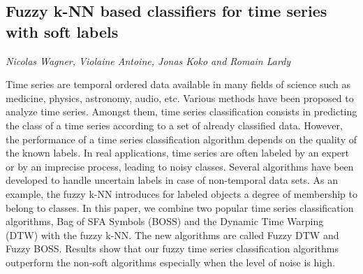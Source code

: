 \documentclass[../booklet.tex]{subfiles}
\begin{document}
\subsection[Fuzzy k-NN based classifiers for time series with soft labels. {\it Nicolas Wagner, Violaine Antoine, Jonas Koko and Romain Lardy}]{Fuzzy k-NN based classifiers for time series with soft labels}
   

\begin{center}
  {\it Nicolas Wagner, Violaine Antoine, Jonas Koko and Romain Lardy}
\end{center}

\vskip 0.8cm


Time series are temporal ordered data available in many fields of science such as medicine, physics, astronomy, audio, etc. Various methods have been proposed to analyze time series. Amongst them, time series classification consists in predicting the class of a time series according to a set of already classified data. However, the performance of a time series classification algorithm depends on the quality of the known labels.  In real applications, time series are often labeled by an expert or by an imprecise process, leading to noisy classes. Several algorithms have been developed to handle uncertain labels in case of non-temporal data sets. As an example, the fuzzy k-NN introduces for labeled objects a degree of membership to belong to classes. In this paper, we combine two popular time series classification algorithms, Bag of SFA Symbols (BOSS) and the Dynamic Time Warping (DTW) with the fuzzy k-NN. The new algorithms are called Fuzzy DTW and Fuzzy BOSS. Results show that our fuzzy time series classification algorithms outperform the non-soft algorithms especially when the level of noise is high.
\end{document}

